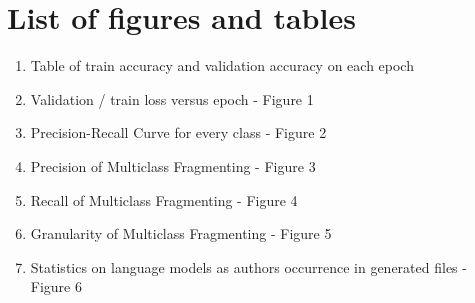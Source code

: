 \documentclass{article}
\begin{document}
\section{List of figures and tables}
\begin{enumerate}
    \item Table of train accuracy and validation accuracy on each epoch
    \item Validation / train loss versus epoch - Figure 1
    \item Precision-Recall Curve for every class - Figure 2
    \item Precision of Multiclass Fragmenting - Figure 3
    \item Recall of Multiclass Fragmenting - Figure 4
    \item Granularity of Multiclass Fragmenting - Figure 5
    \item Statistics on language models as authors occurrence in generated files - Figure 6
    
\end{enumerate}
\end{document}
